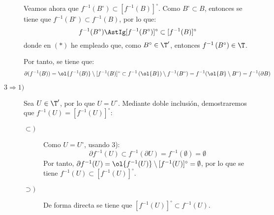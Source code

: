 \begin{ejercicio}
\begin{description}
    Veamos ahora que $f^{-1}(B^\circ)\subset [f^{-1}\left(B\right)]^\circ$. Como $B^\circ \subset B$, entonces se tiene que $f^{-1}(B^\circ)\subset f^{-1}\left(B\right)$, por lo que:
    \begin{equation*}
        f^{-1}(B^\circ) \AstIg [f^{-1}(B^\circ)]^\circ \subset [f^{-1}(B)]^\circ
    \end{equation*}
    donde en $(\ast)$ he empleado que, como $B^\circ \in {\T'}$, entonces $f^{-1}\left({B}^\circ \right)\in \T$.

    Por tanto, se tiene que:
    \begin{equation*}
        \partial (f^{-1}(B)) = \ol{f^{-1}(B)}\setminus [f^{-1}(B)]^\circ \subset f^{-1}\left(\ol{B}\right)\setminus f^{-1}(B^\circ) = f^{-1}(\ol{B}\setminus B^\circ) = f^{-1}(\partial B)
    \end{equation*}

    \item[$3 \Longrightarrow 1)$] Sea $U\in \T'$, por lo que $U=U^\circ$. Mediante doble inclusión, demostraremos que $f^{-1}(U)=[f^{-1}(U)]^\circ$:
    \begin{description}
        \item[$\subset)$] Como $U=U^\circ$, usando 3):
        \begin{equation*}
            \partial f^{-1}(U)\subset f^{-1}(\partial U) = f^{-1}(\emptyset) = \emptyset
        \end{equation*}
        Por tanto, $\partial f^{-1}(U) = \ol{f^{-1}(U)}\setminus [f^{-1}(U)]^\circ=\emptyset$, por lo que se tiene $f^{-1}(U)\subset [f^{-1}(U)]^\circ$.

        \item[$\supset)$] De forma directa se tiene que $[f^{-1}(U)]^\circ \subset f^{-1}(U)$.
    \end{description}
\end{description}
\end{ejercicio}

